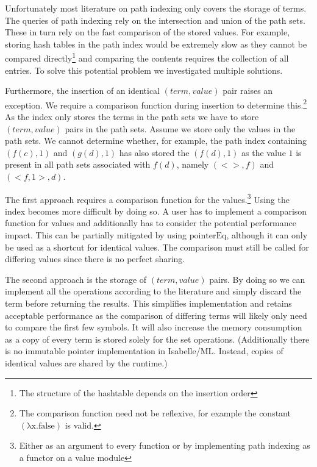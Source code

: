 Unfortunately most literature on path indexing only covers the storage of terms. The queries of path indexing rely on the intersection and union of the path sets. These in turn rely on the fast comparison of the stored values. For example, storing hash tables in the path index would be extremely slow as they cannot be compared directly\footnote{The structure of the hashtable depends on the insertion order} and comparing the contents requires the collection of all entries. To solve this potential problem we investigated multiple solutions.

Furthermore, the insertion of an identical $(term,value)$ pair raises an exception. We require a comparison function during insertion to determine this.\footnote{The comparison function need not be reflexive, for example the constant $\mathrm{(\lambda x. false)}$ is valid.} As the index only stores the terms in the path sets we have to store $(term,value)$ pairs in the path sets. Assume we store only the values in the path sets. We cannot determine whether, for example, the path index containing $(f(c),1)$ and $(g(d),1)$ has also stored the $(f(d),1)$ as the value $1$ is present in all path sets associated with $f(d)$, namely $(<>,f)$ and $(<f,1>,d)$.

The first approach requires a comparison function for the values.\footnote{Either as an argument to every function or by implementing path indexing as a functor on a value module} Using the index becomes more difficult by doing so. A user has to implement a comparison function for values and additionally has to consider the potential performance impact. This can be partially mitigated by using $\mathrm{pointerEq}$, although it can only be used as a shortcut for identical values. The comparison must still be called for differing values since there is no perfect sharing.

The second approach is the storage of $(term, value)$ pairs. By doing so we can implement all the operations according to the literature and simply discard the term before returning the results. This simplifies implementation and retains acceptable performance as the comparison of differing terms will likely only need to compare the first few symbols. It will also increase the memory consumption as a copy of every term is stored solely for the set operations. (Additionally there is no immutable pointer implementation in Isabelle/ML. Instead, copies of identical values are shared by the runtime.)

